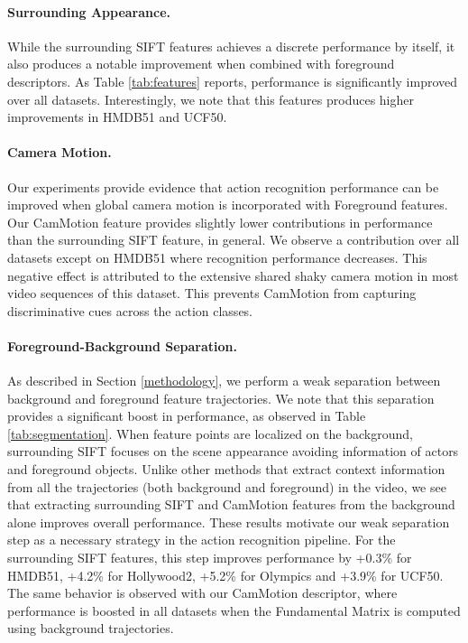 \documentclass[runningheads]{llncs}
\begin{document}
\paragraph{Surrounding Appearance.} While the surrounding SIFT features achieves a discrete performance by itself, it also produces a notable improvement when combined with foreground descriptors. As Table \ref{tab:features} reports, performance is significantly improved over all datasets. Interestingly, we note that this features produces higher improvements in HMDB51 and UCF50.

\paragraph{Camera Motion.} Our experiments provide evidence that action recognition performance can be improved when global camera motion is incorporated with Foreground features. Our CamMotion feature provides slightly lower contributions in performance than the surrounding SIFT feature, in general. We observe a contribution over all datasets except on HMDB51 where recognition performance decreases. This negative effect is attributed to the extensive shared shaky camera motion in most video sequences of this dataset. This prevents CamMotion from capturing discriminative cues across the action classes.

\paragraph{Foreground-Background Separation.} As described in Section \ref{methodology}, we perform a weak separation between background and foreground feature trajectories. We note that this separation provides a significant boost in performance, as observed in Table \ref{tab:segmentation}. When feature points are localized on the background, surrounding SIFT focuses on the scene appearance avoiding information of actors and foreground objects. Unlike other methods that extract context information from all the trajectories (both background and foreground) in the video, we see that extracting surrounding SIFT and CamMotion features from the background alone improves overall performance. These results motivate our weak separation step as a necessary strategy in the action recognition pipeline. For the surrounding SIFT features, this step improves performance by +0.3\% for HMDB51, +4.2\% for Hollywood2, +5.2\% for Olympics and +3.9\% for UCF50. The same behavior is observed with our CamMotion descriptor, where performance is boosted in all datasets when the Fundamental Matrix is computed using background trajectories.
\end{document}

